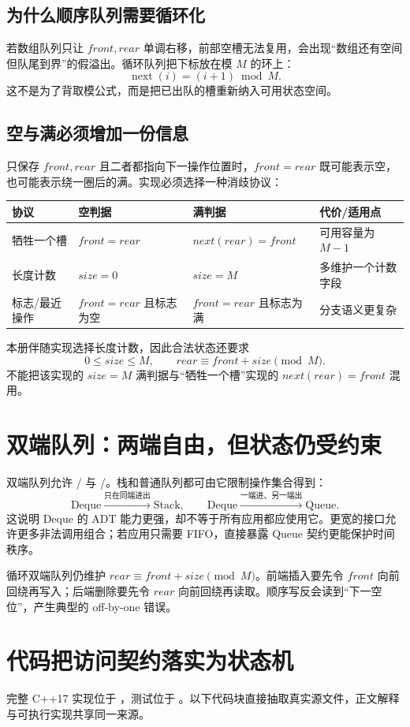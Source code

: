 \documentclass[UTF8,fontset=none,11pt,a4paper]{ctexart}
\begin{document}
\subsection{为什么顺序队列需要循环化}
若数组队列只让 $front,rear$ 单调右移，前部空槽无法复用，会出现“数组还有空间但队尾到界”的假溢出。循环队列把下标放在模 $M$ 的环上：
\[
\operatorname{next}(i)=(i+1)\bmod M.
\]
这不是为了背取模公式，而是把已出队的槽重新纳入可用状态空间。

\subsection{空与满必须增加一份信息}
只保存 $front,rear$ 且二者都指向下一操作位置时，$front=rear$ 既可能表示空，也可能表示绕一圈后的满。实现必须选择一种消歧协议：
\begin{center}\small
\begin{tabularx}{\linewidth}{L{2.4cm}YYY}
\toprule
协议 & 空判据 & 满判据 & 代价/适用点\\
\midrule
牺牲一个槽 & $front=rear$ & $next(rear)=front$ & 可用容量为 $M-1$\\
长度计数 & $size=0$ & $size=M$ & 多维护一个计数字段\\
标志/最近操作 & $front=rear$ 且标志为空 & $front=rear$ 且标志为满 & 分支语义更复杂\\
\bottomrule
\end{tabularx}
\end{center}
本册伴随实现选择长度计数，因此合法状态还要求
\[
0\le size\le M,\qquad rear\equiv front+size\pmod M.
\]
不能把该实现的 $size=M$ 满判据与“牺牲一个槽”实现的 $next(rear)=front$ 混用。

\section{双端队列：两端自由，但状态仍受约束}
双端队列允许 / 与 /。栈和普通队列都可由它限制操作集合得到：
\[
\text{Deque}\xrightarrow{\text{只在同端进出}}\text{Stack},\qquad
\text{Deque}\xrightarrow{\text{一端进、另一端出}}\text{Queue}.
\]
这说明 Deque 的 ADT 能力更强，却不等于所有应用都应使用它。更宽的接口允许更多非法调用组合；若应用只需要 FIFO，直接暴露 Queue 契约更能保护时间秩序。

循环双端队列仍维护 $rear\equiv front+size\pmod M$。前端插入要先令 $front$ 向前回绕再写入；后端删除要先令 $rear$ 向前回绕再读取。顺序写反会读到“下一空位”，产生典型的 off-by-one 错误。

\section{代码把访问契约落实为状态机}
完整 C++17 实现位于 ，测试位于 。以下代码块直接抽取真实源文件，正文解释与可执行实现共享同一来源。
\end{document}
